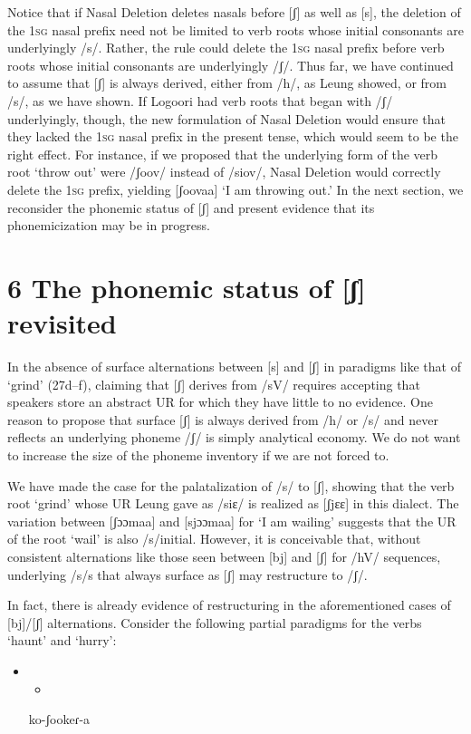 Notice that if Nasal Deletion deletes nasals before [ʃ] as well as [s], the deletion of the 1\textsc{sg} nasal prefix need not be limited to verb roots whose initial consonants are underlyingly /s/. Rather, the rule could delete the 1\textsc{sg} nasal prefix before verb roots whose initial consonants are underlyingly /ʃ/. Thus far, we have continued to assume that [ʃ] is always derived, either from /h/, as Leung showed, or from /s/, as we have shown. If Logoori had verb roots that began with /ʃ/ underlyingly, though, the new formulation of Nasal Deletion would ensure that they lacked the 1\textsc{sg} nasal prefix in the present tense, which would seem to be the right effect. For instance, if we proposed that the underlying form of the verb root ‘throw out’ were /ʃoov/ instead of /siov/, Nasal Deletion would correctly delete the 1\textsc{sg} prefix, yielding [ʃoovaa] ‘I am throwing out.’ In the next section, we reconsider the phonemic status of [ʃ] and present evidence that its phonemicization may be in progress.

\chapter{6 The phonemic status of [ʃ] revisited}

In the absence of surface alternations between [s] and [ʃ] in paradigms like that of ‘grind’ (27d–f), claiming that [ʃ] derives from /sV/ requires accepting that speakers store an abstract UR for which they have little to no evidence. One reason to propose that surface [ʃ] is always derived from /h/ or /s/ and never reflects an underlying phoneme /ʃ/ is simply analytical economy. We do not want to increase the size of the phoneme inventory if we are not forced to.

We have made the case for the palatalization of /s/ to [ʃ], showing that the verb root ‘grind’ whose UR Leung gave as /siɛ/ is realized as [ʃjɛɛ] in this dialect. The variation between [ʃɔɔmaa] and [sjɔɔmaa] for ‘I am wailing’ suggests that the UR of the root ‘wail’ is also /s/initial. However, it is conceivable that, without consistent alternations like those seen between [bj] and [ʃ] for /hV/ sequences, underlying /s/s that always surface as [ʃ] may restructure to /ʃ/. 

In fact, there is already evidence of restructuring in the aforementioned cases of [bj]/[ʃ] alternations. Consider the following partial paradigms for the verbs ‘haunt’ and ‘hurry’:

\setcounter{itemize}{0}
\begin{itemize}
\item \setcounter{itemize}{0}
\begin{itemize}
\item \end{itemize}
\end{itemize}
\setcounter{itemize}{0}
\begin{itemize}
\item [ko-ʃookeɾ-a]

\end{itemize}

